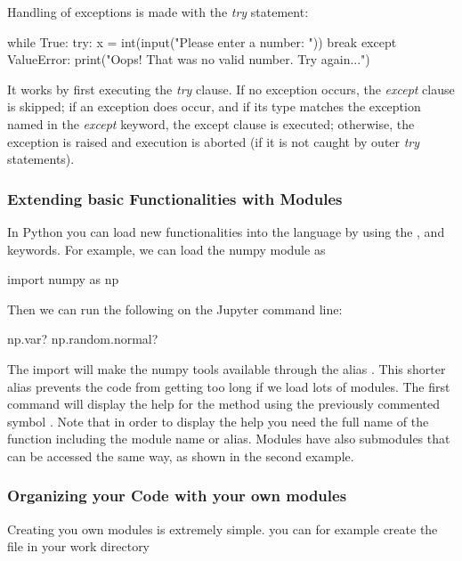 \noindent Handling of exceptions is made with the \textit{try} statement:

\begin{python}
while True:
    try:
        x = int(input("Please enter a number: "))
        break
    except ValueError:
        print("Oops! That was no valid number. Try again...")
\end{python}

It works by first executing the \textit{try} clause. If no exception occurs, the \textit{except} clause is skipped; if an exception does occur, and if its type matches the exception named in the \textit{except} keyword, the except clause is executed; otherwise, the exception is raised and execution is aborted (if it is not caught by outer \textit{try} statements).


\subsubsection{Extending basic Functionalities with Modules}

In Python you can load new functionalities into the language by using the
,  and  keywords. For example, we can load the
numpy module as

\begin{python}
import numpy as np
\end{python}

\noindent Then we can run the following on the Jupyter command line:

\begin{python}
np.var?
np.random.normal?
\end{python}

The import will make the numpy tools available through the alias .  This shorter alias prevents the code from getting too long if we load lots of modules. The first command will display the help for the method  using the previously commented symbol . Note that in order to display the help you need the full name of the function including the module name or alias. Modules have also submodules that can be accessed the same way, as shown in the second example.

\subsubsection{Organizing your Code with your own modules}

Creating you own modules is extremely simple. you can for example create the
file in your work directory

